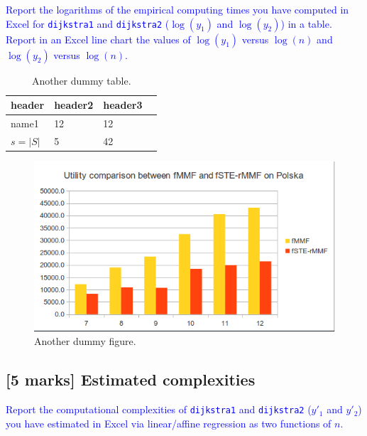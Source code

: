 \documentclass[a4paper]{article}
\numberwithin{equation}{section} %
\begin{document}
\textcolor{blue}{
  Report the logarithms of the empirical computing times you have computed in Excel for {\tt dijkstra1} and {\tt dijkstra2} ($\log(y_1)$ and $\log(y_2)$) in a table.
  Report in an Excel line chart the values of $\log(y_1)$ versus $\log(n)$ and $\log(y_2)$ versus $\log(n)$.
}

\begin{table}[h!]
  \caption{Another dummy table.}
  \begin{center}
\begin{tabular}{l|lll}
  header    & header2 & header3 \\
  \hline
  name1     & 12      & 12\\
  $s = |S|$ & 5       & 42
\end{tabular}
  \end{center}
\label{tab:1}
\end{table}


\begin{figure}[h!]
  \begin{center}
    \includegraphics[scale=0.5]{./dummy.png}
  \end{center}
  \caption{Another dummy figure.}
  \label{fig:a_figure}
\end{figure}




\subsection{[5 marks] Estimated complexities}

\textcolor{blue}{
  Report the computational complexities of {\tt dijkstra1} and {\tt dijkstra2} ($y'_1$ and $y'_2$) you have estimated in Excel via linear/affine regression as two functions of $n$.
}

\end{document}

